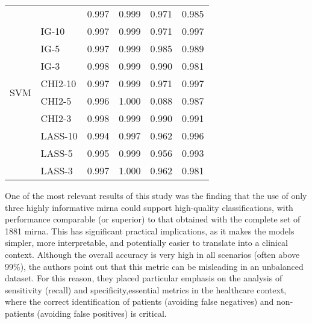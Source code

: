 \begin{table}[h!]
\begin{tabular}{llcccc}
    \midrule
    \multirow{10}{*}{SVM}
                        &                 & 0.997             & 0.999                & 0.971                & 0.985        \\
                        & IG-10           & 0.997             & 0.999                & 0.971                & 0.997        \\
                        & IG-5            & 0.997             & 0.999                & 0.985                & 0.989        \\
                        & IG-3            & 0.998             & 0.999                & 0.990                & 0.981        \\
                        & CHI2-10         & 0.997             & 0.999                & 0.971                & 0.997        \\
                        & CHI2-5          & 0.996             & 1.000                & 0.088                & 0.987        \\
                        & CHI2-3          & 0.998             & 0.999                & 0.990                & 0.991        \\
                        & LASS-10         & 0.994             & 0.997                & 0.962                & 0.996        \\
                        & LASS-5          & 0.995             & 0.999                & 0.956                & 0.993        \\
                        & LASS-3          & 0.997             & 1.000                & 0.962                & 0.981        \\

    \bottomrule
  \end{tabular}
\end{table}

One of the most relevant results of this study was the finding that the use of
only three highly informative \gls{mirna} could support high-quality
classifications, with performance comparable (or superior) to that obtained
with the complete set of 1881 \gls{mirna}. This has significant practical
implications, as it makes the models simpler, more interpretable, and
potentially easier to translate into a clinical context. Although the overall
accuracy is very high in all scenarios (often above 99\%), the authors point
out that this metric can be misleading in an unbalanced dataset. For this
reason, they placed particular emphasis on the analysis of sensitivity (recall)
and specificity,essential metrics in the healthcare context, where the correct
identification of patients (avoiding false negatives) and non-patients
(avoiding false positives) is critical.

